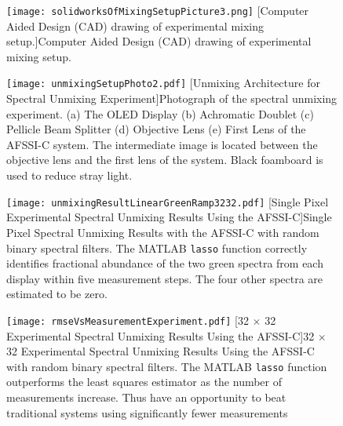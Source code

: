 \begin{figure}
	\centering
	\texttt{[image: solidworksOfMixingSetupPicture3.png]}
	[Computer Aided Design (CAD) drawing of experimental mixing setup.]{Computer Aided Design (CAD) drawing of experimental mixing setup.}
	\label{fig:solidworksOfMixingSetupPicture3} 
\end{figure}


\begin{figure}
	\centering
	\texttt{[image: unmixingSetupPhoto2.pdf]}
	[Unmixing Architecture for Spectral Unmixing Experiment]{Photograph of the spectral unmixing experiment. (a) The OLED Display (b) Achromatic Doublet (c) Pellicle Beam Splitter (d) Objective Lens (e) First Lens of the AFSSI-C system. The intermediate image is located between the objective lens and the first lens of the system. Black foamboard is used to reduce stray light.}
	\label{fig:unmixingSetupPhoto2} 
\end{figure}

\begin{figure}
	\centering
	\texttt{[image: unmixingResultLinearGreenRamp3232.pdf]}
	[Single Pixel Experimental Spectral Unmixing Results Using the AFSSI-C]{Single Pixel Spectral Unmixing Results with the AFSSI-C with random binary spectral filters. The MATLAB \texttt{lasso} function correctly identifies fractional abundance of the two green spectra from each display within five measurement steps. The four other spectra are estimated to be zero. }
	\label{fig:unmixingResultLinearGreenRamp3232} 
\end{figure}

\begin{figure}
	\centering
	\texttt{[image: rmseVsMeasurementExperiment.pdf]}
	[32 $\times$ 32 Experimental Spectral Unmixing Results Using the AFSSI-C]{32 $\times$ 32 Experimental Spectral Unmixing Results Using the AFSSI-C with random binary spectral filters. The MATLAB \texttt{lasso} function outperforms the least squares estimator as the number of measurements increase. Thus have an opportunity to beat traditional systems using significantly fewer measurements}
	\label{fig:rmseVsMeasurementExperiment} 
\end{figure}


